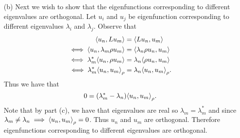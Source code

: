\documentclass[12pt]{report}
\begin{document}
\begin{solution}
\begin{enumerate}
        \item [(b)]
        Next we wish to show that the eigenfunctions corresponding to different eigenvalues are orthogonal. Let $u_i$ and $u_j$ be eigenfunction corresponding to different eigenvalues $\lambda_i$ and $\lambda_j$. Observe that
        \begin{align*}
            {\left\langle u_n,Lu_m\right\rangle} &= {\left\langle Lu_n,u_m\right\rangle}\\
            \iff  {\left\langle u_n,\lambda_m \rho u_m\right\rangle} &= {\left\langle\lambda_n \rho u_n,u_m\right\rangle}\\
            \iff  \lambda_m^*{\left\langle u_n, \rho u_m\right\rangle} &= \lambda_n{\left\langle \rho u_n,u_m\right\rangle}\\
            \iff  \lambda_m^*{\left\langle u_n, u_m\right\rangle}_\rho &= \lambda_n{\left\langle u_n,u_m\right\rangle}_\rho.
        \end{align*}
        Thus we have that
        \[ 
            0 = (\lambda_m^* - \lambda_n) {\left\langle u_n,u_m\right\rangle}_\rho.
        \]
        Note that by part (c), we have that eigenvalues are real so $\lambda_m = \lambda_m^*$ and since $\lambda_m \neq \lambda_n \implies {\left\langle u_n,u_m\right\rangle}_\rho = 0$. Thus $u_n$ and $u_m$ are orthogonal. Therefore eigenfunctions corresponding to different eigenvalues are orthogonal.



\end{enumerate}
\end{solution}
\end{document}
